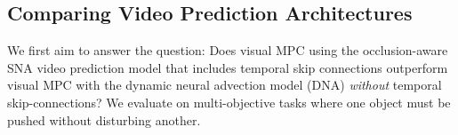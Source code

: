 \subsection{Comparing Video Prediction Architectures}
\label{subsec:sna_experiments}
We first aim to answer the question: Does  visual MPC using the occlusion-aware SNA video prediction model that includes temporal skip connections outperform visual MPC with the dynamic neural advection model (DNA)\cite{foresight} \emph{without} temporal skip-connections?
We evaluate on multi-objective tasks where one object must be pushed without disturbing another.

	
	
